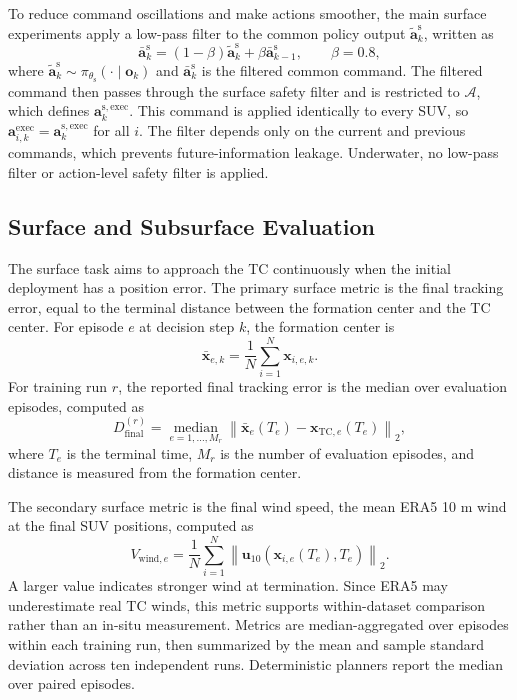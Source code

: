 \documentclass[a4paper,fleqn]{cas-dc}
\begin{document}
To reduce command oscillations and make actions smoother, the main surface
experiments apply a low-pass filter to the common policy output
\(\tilde{\mathbf{a}}_k^{\mathrm{s}}\), written as
\begin{equation}
\bar{\mathbf{a}}_k^{\mathrm{s}}=
(1-\beta)\tilde{\mathbf{a}}_k^{\mathrm{s}}
+\beta\bar{\mathbf{a}}_{k-1}^{\mathrm{s}},
\qquad \beta=0.8,
\label{eq:filter}
\end{equation}
where \(\tilde{\mathbf{a}}_k^{\mathrm{s}}
\sim\pi_{\theta_{\mathrm{s}}}(\cdot\mid\mathbf{o}_k)\) and
\(\bar{\mathbf{a}}_k^{\mathrm{s}}\) is the filtered common command. The filtered
command then passes through the surface safety filter and is restricted to
\(\mathcal{A}\), which defines \(\mathbf{a}_k^{\mathrm{s,exec}}\). This command is
applied identically to every SUV, so
\(\mathbf{a}_{i,k}^{\mathrm{exec}}=
\mathbf{a}_k^{\mathrm{s,exec}}\) for all \(i\). The filter depends only on the
current and previous commands, which prevents future-information leakage.
Underwater, no low-pass filter or action-level safety filter is applied.

\subsection{Surface and Subsurface Evaluation}
\label{subsec:evaluation}

The surface task aims to approach the TC continuously when the initial
deployment has a position error. The primary surface metric is the final
tracking error, equal to the terminal distance between the formation center and
the TC center.
For episode \(e\) at decision step \(k\), the formation center is
\begin{equation}
\bar{\mathbf{x}}_{e,k}
=
\frac{1}{N}\sum_{i=1}^{N}\mathbf{x}_{i,e,k}.
\label{eq:surface_formation_center}
\end{equation}
For training run \(r\), the reported final tracking error is the median over
evaluation episodes, computed as
\begin{equation}
D_{\mathrm{final}}^{(r)}
=
\operatorname*{median}_{e=1,\ldots,M_r}
\left\|
\bar{\mathbf{x}}_{e}(T_e)
-
\mathbf{x}_{\mathrm{TC},e}(T_e)
\right\|_2,
\label{eq:final_tracking_error}
\end{equation}
where \(T_e\) is the terminal time, \(M_r\) is the number of evaluation
episodes, and distance is measured from the formation center.

The secondary surface metric is the final wind speed, the mean ERA5 10 m wind
at the final SUV positions, computed as
\begin{equation}
V_{\mathrm{wind},e}
=
\frac{1}{N}
\sum_{i=1}^{N}
\left\|
\mathbf{u}_{10}
\left(
\mathbf{x}_{i,e}(T_e),T_e
\right)
\right\|_2 .
\label{eq:final_wind_speed}
\end{equation}
A larger value indicates stronger wind at termination. Since ERA5 may
underestimate real TC winds, this metric supports within-dataset comparison
rather than an in-situ measurement. Metrics are median-aggregated over episodes
within each training run, then summarized by the mean and sample standard
deviation across ten independent runs. Deterministic planners report the median
over paired episodes.
\end{document}
